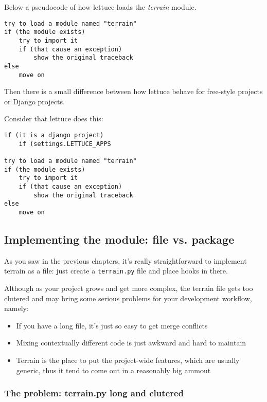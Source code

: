 \documentclass[letterpaper]{article}
\begin{document}
\noindent
Below a pseudocode of how lettuce loads the \textit{terrain} module.

\footnotesize
\begin{verbatim}
try to load a module named "terrain"
if (the module exists)
    try to import it
    if (that cause an exception)
        show the original traceback
else
    move on
\end{verbatim}

\noindent
Then there is a small difference between how lettuce behave for
free-style projects or Django projects.

\noindent
Consider that lettuce does this:

\footnotesize
\begin{verbatim}
if (it is a django project)
    if (settings.LETTUCE_APPS

try to load a module named "terrain"
if (the module exists)
    try to import it
    if (that cause an exception)
        show the original traceback
else
    move on
\end{verbatim}

\normalsize

\subsection*{Implementing the module: file vs. package}

As you saw in the previous chapters, it's really straightforward to
implement terrain as a file: just create a \texttt{terrain.py} file
and place hooks in there.

Although as your project grows and get more complex, the terrain file gets too clutered and may bring some serious problems for your development workflow, namely:

\begin{itemize}
\item{If you have a long file, it's just so easy to get merge conflicts}
\item{Mixing contextually different code is just awkward and hard to maintain}
\item{Terrain is the place to put the project-wide features, which are usually generic, thus it tend to come out in a reasonably big ammout}
\end{itemize}

\subsubsection*{The problem: terrain.py long and clutered}
\end{document}
